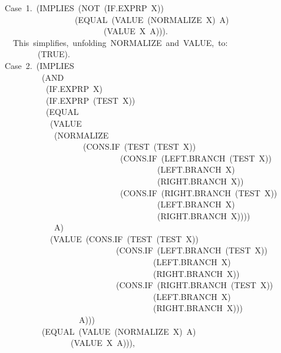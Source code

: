 \documentclass[11pt]{book}
\newenvironment{pubasis}{\begin{flushleft}\ttfamily\small}{\normalsize\rmfamily\end{flushleft}}
\begin{document}
\begin{pubasis}
Case~1.~(IMPLIES~(NOT~(IF.EXPRP~X))\\
~~~~~~~~~~~~~~~~~(EQUAL~(VALUE~(NORMALIZE~X)~A)\\
~~~~~~~~~~~~~~~~~~~~~~~~(VALUE~X~A))).\\

~~This~simplifies,~unfolding~NORMALIZE~and~VALUE,~to:\\

~~~~~~~~(TRUE).\\

Case~2.~(IMPLIES\\
~~~~~~~~~(AND\\
~~~~~~~~~~(IF.EXPRP~X)\\
~~~~~~~~~~(IF.EXPRP~(TEST~X))\\
~~~~~~~~~~(EQUAL\\
~~~~~~~~~~~(VALUE\\
~~~~~~~~~~~~(NORMALIZE\\
~~~~~~~~~~~~~~~~~~~(CONS.IF~(TEST~(TEST~X))\\
~~~~~~~~~~~~~~~~~~~~~~~~~~~~(CONS.IF~(LEFT.BRANCH~(TEST~X))\\
~~~~~~~~~~~~~~~~~~~~~~~~~~~~~~~~~~~~~(LEFT.BRANCH~X)\\
~~~~~~~~~~~~~~~~~~~~~~~~~~~~~~~~~~~~~(RIGHT.BRANCH~X))\\
~~~~~~~~~~~~~~~~~~~~~~~~~~~~(CONS.IF~(RIGHT.BRANCH~(TEST~X))\\
~~~~~~~~~~~~~~~~~~~~~~~~~~~~~~~~~~~~~(LEFT.BRANCH~X)\\
~~~~~~~~~~~~~~~~~~~~~~~~~~~~~~~~~~~~~(RIGHT.BRANCH~X))))\\
~~~~~~~~~~~~A)\\
~~~~~~~~~~~(VALUE~(CONS.IF~(TEST~(TEST~X))\\
~~~~~~~~~~~~~~~~~~~~~~~~~~~(CONS.IF~(LEFT.BRANCH~(TEST~X))\\
~~~~~~~~~~~~~~~~~~~~~~~~~~~~~~~~~~~~(LEFT.BRANCH~X)\\
~~~~~~~~~~~~~~~~~~~~~~~~~~~~~~~~~~~~(RIGHT.BRANCH~X))\\
~~~~~~~~~~~~~~~~~~~~~~~~~~~(CONS.IF~(RIGHT.BRANCH~(TEST~X))\\
~~~~~~~~~~~~~~~~~~~~~~~~~~~~~~~~~~~~(LEFT.BRANCH~X)\\
~~~~~~~~~~~~~~~~~~~~~~~~~~~~~~~~~~~~(RIGHT.BRANCH~X)))\\
~~~~~~~~~~~~~~~~~~A)))\\
~~~~~~~~~(EQUAL~(VALUE~(NORMALIZE~X)~A)\\
~~~~~~~~~~~~~~~~(VALUE~X~A))),\\


\end{pubasis}
\end{document}
